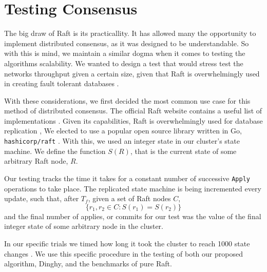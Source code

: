 \section{Testing Consensus}

	The big draw of Raft is its practicallity. It has allowed many the opportunity to implement distributed consensus, as it was designed to be understandable. So with this is mind, we maintain a similar dogma when it comes to testing the algorithms scalability. We wanted to design a test that would stress test the networks throughput given a certain size, given that Raft is overwhelmingly used in creating fault tolerant databases \cite{etcd, CockroachDB, TiKV, RethinkDB}.

	With these considerations, we first decided the most common use case for this method of distributed consensus. The official Raft website contains a useful list of implementations \cite{RaftSite}. Given its capabilities, Raft is overwhelmingly used for database replication , 
	We elected to use a popular open source library written in Go, \texttt{hashicorp/raft} \cite{HashicorpRaft}. With this, we used an integer state in our cluster's state machine. We define the function $S(R)$, that is the current state of some arbitrary Raft node, $R$.

	Our testing tracks the time it takes for a constant number of successive \texttt{Apply} operations to take place.
	The replicated state machine is being incremented every update, such that, after $T_{f}$, given a set of Raft nodes $C$, \[\{r_{1},r_{2} \in C: S(r_{1})=S(r_{2})\}\] and the final number of applies, or commits for our test was the value of the final integer state of some arbitrary node in the cluster.

	In our specific trials we timed how long it took the cluster to reach 1000 state changes \cite{Dinghy}. We use this specific procedure in the testing of both our proposed algorithm, Dinghy, and the benchmarks of pure Raft.